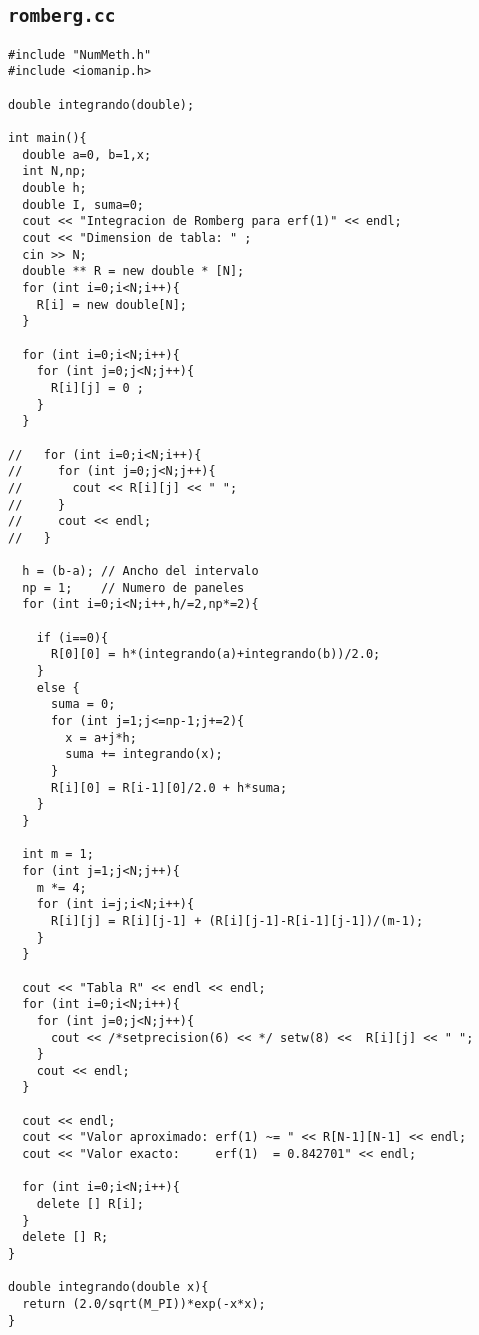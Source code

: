 \documentclass[12pt]{article}
\begin{document}
\subsection{\tt romberg.cc}

\begin{verbatim}
#include "NumMeth.h"
#include <iomanip.h>

double integrando(double);

int main(){
  double a=0, b=1,x;
  int N,np;
  double h;
  double I, suma=0;
  cout << "Integracion de Romberg para erf(1)" << endl;
  cout << "Dimension de tabla: " ;
  cin >> N;
  double ** R = new double * [N];
  for (int i=0;i<N;i++){
    R[i] = new double[N];
  }

  for (int i=0;i<N;i++){
    for (int j=0;j<N;j++){
      R[i][j] = 0 ;
    }
  }

//   for (int i=0;i<N;i++){
//     for (int j=0;j<N;j++){
//       cout << R[i][j] << " ";
//     }
//     cout << endl;
//   }

  h = (b-a); // Ancho del intervalo
  np = 1;    // Numero de paneles
  for (int i=0;i<N;i++,h/=2,np*=2){
 
    if (i==0){
      R[0][0] = h*(integrando(a)+integrando(b))/2.0;
    }
    else {
      suma = 0;
      for (int j=1;j<=np-1;j+=2){
        x = a+j*h;
        suma += integrando(x);
      }
      R[i][0] = R[i-1][0]/2.0 + h*suma;
    }
  }
  
  int m = 1;
  for (int j=1;j<N;j++){
    m *= 4;
    for (int i=j;i<N;i++){
      R[i][j] = R[i][j-1] + (R[i][j-1]-R[i-1][j-1])/(m-1);
    }
  }
  
  cout << "Tabla R" << endl << endl;
  for (int i=0;i<N;i++){
    for (int j=0;j<N;j++){
      cout << /*setprecision(6) << */ setw(8) <<  R[i][j] << " ";
    }
    cout << endl;
  }

  cout << endl;
  cout << "Valor aproximado: erf(1) ~= " << R[N-1][N-1] << endl;
  cout << "Valor exacto:     erf(1)  = 0.842701" << endl;

  for (int i=0;i<N;i++){
    delete [] R[i];
  }
  delete [] R;
}

double integrando(double x){
  return (2.0/sqrt(M_PI))*exp(-x*x);
}
  

\end{verbatim}
\end{document}
